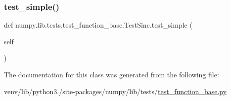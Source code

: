 \mbox{\label{classnumpy_1_1lib_1_1tests_1_1test__function__base_1_1TestSinc_a49cc2564a5c00c7c4bfde1f9efe1dce3}} 
\subsubsection{\texorpdfstring{test\+\_\+simple()}{test\_simple()}}
{\footnotesize\ttfamily def numpy.\+lib.\+tests.\+test\+\_\+function\+\_\+base.\+Test\+Sinc.\+test\+\_\+simple (\begin{DoxyParamCaption}\item[{}]{self }\end{DoxyParamCaption})}



The documentation for this class was generated from the following file\+:\begin{DoxyCompactItemize}
\item 
venv/lib/python3./site-\/packages/numpy/lib/tests/\hyperlink{lib_2tests_2test__function__base_8py}{test\+\_\+function\+\_\+base.\+py}\end{DoxyCompactItemize}
